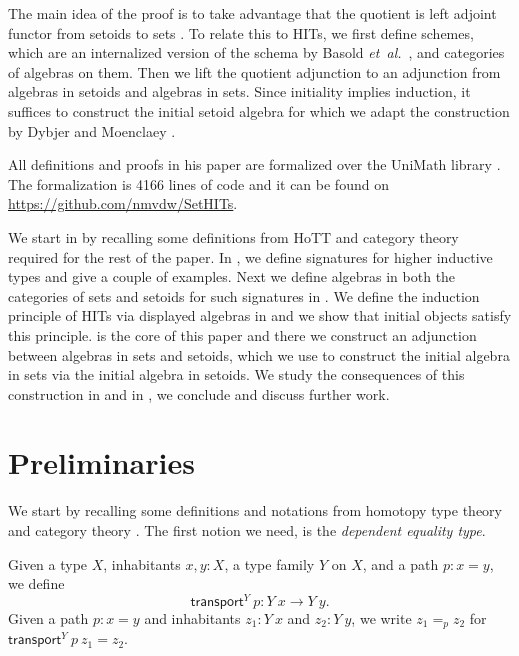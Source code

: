 \documentclass[9pt]{entcs}
\newcommand{\etal}{\emph{et~al.}}
\newcommand{\function}[1]{\mathsf{#1}}
\newcommand{\0}{\textbf{0}} %
\newcommand{\1}{\textbf{1}} %
\newcommand{\transport}[2]{\function{transport}^{#1} \> #2} %
\newcommand{\depeq}[3]{#2 =_{#1} #3} %
\begin{document}
The main idea of the proof is to take advantage that the quotient is left adjoint functor from setoids to sets \cite{RijkeS15}.
To relate this to HITs, we first define schemes, which are an internalized version of the schema by Basold \etal \ \cite{BasoldGW17}, and categories of algebras on them.
Then we lift the quotient adjunction to an adjunction from algebras in setoids and algebras in sets.
Since initiality implies induction, it suffices to construct the initial setoid algebra for which we adapt the construction by Dybjer and Moenclaey \cite{moeneclaey2016schema,DybjerM18}.

All definitions and proofs in his paper are formalized over the UniMath library \cite{UniMath}.
The formalization is 4166 lines of code and it can be found on \url{https://github.com/nmvdw/SetHITs}.

We start in  by recalling some definitions from HoTT and category theory required for the rest of the paper.
In , we define signatures for higher inductive types and give a couple of examples.
Next we define algebras in both the categories of sets and setoids for such signatures in .
We define the induction principle of HITs via displayed algebras in  and we show that initial objects satisfy this principle.
 is the core of this paper and there we construct an adjunction between algebras in sets and setoids, which we use to construct the initial algebra in sets via the initial algebra in setoids.
We study the consequences of this construction in  and in , we conclude and discuss further work.

\section{Preliminaries}
\label{sec:prelim}
We start by recalling some definitions and notations from homotopy type theory and category theory \cite{mac2013categories,hottbook}.
The first notion we need, is the \emph{dependent equality type}.

\begin{definition}
\label{def:depeq}
Given a type $X$, inhabitants $x, y : X$, a type family $Y$ on $X$, and a path $p : x = y$, we define
\[
\transport{Y}{p} : Y \> x \rightarrow Y \> y.
\]
Given a path $p : x = y$ and inhabitants $z_1 : Y \> x$ and $z_2 : Y \> y$, we write $\depeq{p}{z_1}{z_2}$ for $\transport{Y}{p} \ z_1 = z_2$.
\end{definition}
\end{document}
